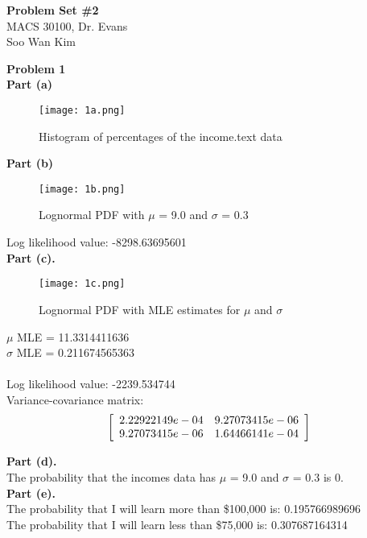 \documentclass[letterpaper,12pt]{article}
\theoremstyle{definition}
\begin{document}
\begin{flushleft}
  \textbf{\large{Problem Set \#2}} \\
  MACS 30100, Dr. Evans \\
  Soo Wan Kim
\end{flushleft}

\noindent\textbf{Problem 1} \\
\textbf {Part (a)}

\begin{figure}[h!]
  \texttt{[image: 1a.png]}
  \caption{Histogram of percentages of the income.text data}
\end{figure}

\noindent
\textbf {Part (b)} 

\begin{figure}[h!]
  \texttt{[image: 1b.png]}
  \caption{Lognormal PDF with $\mu$ = 9.0 and $\sigma$ = 0.3}
\end{figure}

\noindent
Log likelihood value: -8298.63695601\\

\noindent\textbf {Part (c).} 

\begin{figure}[h!]
  \texttt{[image: 1c.png]}
  \caption{Lognormal PDF with MLE estimates for $\mu$ and $\sigma$}
\end{figure}

\noindent
$\mu$ MLE = 11.3314411636\\
$\sigma$ MLE = 0.211674565363 \\\\
Log likelihood value: -2239.534744\\
Variance-covariance matrix: \\
$$ \left[
\begin{array}{c c}
2.22922149e-04 		& 		9.27073415e-06 \\
9.27073415e-06 		& 		1.64466141e-04 \\
\end{array} \right] 
$$

\noindent\textbf {Part (d).} \\
The probability that the incomes data has $\mu$ = 9.0 and $\sigma$ = 0.3 is 0. \\

\noindent
\textbf {Part (e).} \\
The probability that I will learn more than \$100,000 is: 0.195766989696 \\
The probability that I will learn less than \$75,000 is: 0.307687164314\\
\end{document}
